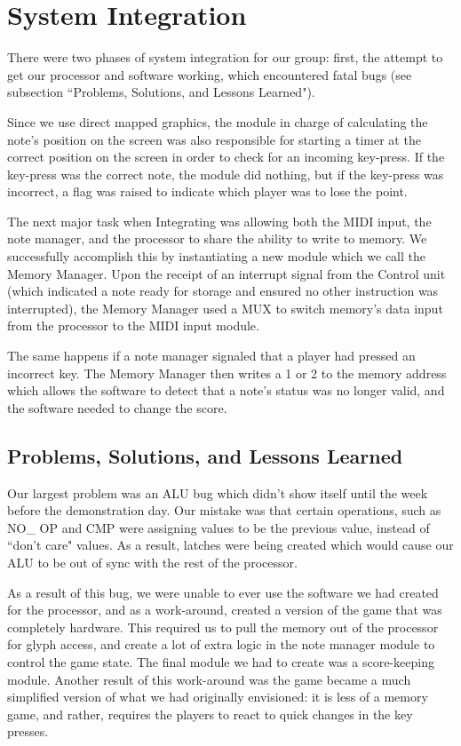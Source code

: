 \documentclass[onecolumn, 12pt]{IEEEtran}
\begin{document}
\section{System Integration}
There were two phases of system integration for our group: first, the attempt to get our processor and software working, which encountered fatal bugs (see subsection ``Problems, Solutions, and Lessons Learned").
\par 
 Since we use direct mapped graphics, the module in charge of calculating the note's position on the screen was also responsible for starting a timer at the correct position on the screen in order to check for an incoming key-press. If the key-press was the correct note, the module did nothing, but if the key-press was incorrect, a flag was raised to indicate which player was to lose the point.
 \par
 The next major task when Integrating was allowing both the MIDI input, the note manager, and the processor to share the ability to write to memory.  We successfully accomplish this by instantiating a new module which we call the Memory Manager.  Upon the receipt of an interrupt signal from the Control unit (which indicated a note ready for storage and ensured no other instruction was interrupted), the Memory Manager used a MUX to switch memory's data input from the processor to the MIDI input module.
 \par
The same happens if a note manager signaled that a player had pressed an incorrect key.  The Memory Manager then writes a 1 or 2 to the memory address which allows the software to detect that a note's status was no longer valid, and the software needed to change the score.
\subsection{Problems, Solutions, and Lessons Learned}
Our largest problem was an ALU bug which didn't show itself until the week before the demonstration day.  Our mistake was that certain operations, such as NO\_ OP and CMP were assigning values to be the previous value, instead of ``don't care" values.  As a result, latches were being created which would cause our ALU to be out of sync with the rest of the processor.
\par
As a result of this bug, we were unable to ever use the software we had created for the processor, and as a work-around, created a version of the game that was completely hardware.  This required us to pull the memory out of the processor for glyph access, and create a lot of extra logic in the note manager module to control the game state.  The final module we had to create was a score-keeping module.  Another result of this work-around was the game became a much simplified version of what we had originally envisioned: it is less of a memory game, and rather, requires the players to react to quick changes in the key presses.  
\end{document}
